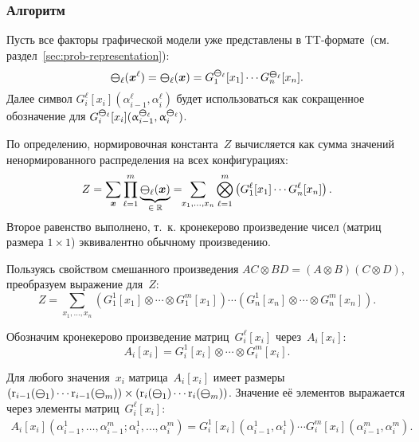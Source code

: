 \subsubsection{Алгоритм}
Пусть все факторы графической модели уже представлены в TT\hyp{}формате~(см. раздел~\ref{sec:prob-representation}):
\begin{equation}
\boldsymbol{\mathcal{\Psi}}_{\ell}(\boldsymbol{x}^{\ell}) = \boldsymbol{\mathcal{\Psi}}_{\ell}(\boldsymbol{x}) = G^{\boldsymbol{\mathcal{\Psi}}_{\ell}}_1[x_1] \dotsm G^{\boldsymbol{\mathcal{\Psi}}_{\ell}}_n[x_n].
\end{equation}
Далее символ $G^{\ell}_i[x_i](\alpha^{\ell}_{i - 1}, \alpha^{\ell}_i)$ будет использоваться как сокращенное обозначение для $G^{\boldsymbol{\mathcal{\Psi}}_{\ell}}_i[x_i](\upalpha^{\boldsymbol{\mathcal{\Psi}}_{\ell}}_{i - 1}, \upalpha^{\boldsymbol{\mathcal{\Psi}}_{\ell}}_i)$.

По определению, нормировочная константа~$Z$ вычисляется как сумма значений ненормированного распределения на всех конфигурациях:
\begin{equation*}
Z = \sum_{\boldsymbol{x}} \prod_{\ell = 1}^{m} \underbrace{\boldsymbol{\mathcal{\Psi}}_{\ell}(\boldsymbol{x})}_{\text{$\in \mathbb{R}$}}
= \!\!\sum_{x_1, \dots, x_n} \bigotimes_{\ell = 1}^{m} \left (G^{\ell}_1[x_1] \dotsm G^{\ell}_n[x_n]  \right).
\end{equation*}
Второе равенство выполнено, т.~к. кронекерово произведение чисел (матриц размера $1 \times 1$) эквивалентно обычному произведению.


Пользуясь свойством смешанного произведения $AC \otimes BD = (A\otimes B)(C \otimes D)$, преобразуем выражение для~$Z$:
\begin{equation*}
Z =
\sum_{x_1, \dots, x_n} \left ( G^1_1[x_1] \otimes \dotsb \otimes G^m_1[x_1] \right ) \dotsm
\left ( G^1_n[x_n] \otimes \dotsb \otimes G^m_n[x_n] \right ).
\end{equation*}

Обозначим кронекерово произведение матриц~$G^\ell_i[x_i]$ через~$A_i[x_i]$:
\begin{equation*}
A_i[x_i] = G^1_i[x_i] \otimes \dotsb \otimes G^m_i[x_i].
\end{equation*}

Для любого значения~$x_i$ матрица~$A_i[x_i]$ имеет размеры $(\operatorname{r}_{i - 1}(\boldsymbol{\mathcal{\Psi}}_1)  \dotsm  \operatorname{r}_{i - 1}(\boldsymbol{\mathcal{\Psi}}_m)) \times (\operatorname{r}_{i}(\boldsymbol{\mathcal{\Psi}}_1)  \dotsm  \operatorname{r}_{i}(\boldsymbol{\mathcal{\Psi}}_m))$. Значение её элементов выражается через элементы матриц~$G_i^{\ell}[x_i]$:
\begin{multline*}
A_i[x_i](\alpha^1_{i - 1}, \dots, \alpha^m_{i - 1}; \alpha^1_i, \dots, \alpha^m_i) = G^1_i[x_i](\alpha^1_{i - 1}, \alpha^1_i)  \dotsm  G^m_i[x_i](\alpha^m_{i - 1}, \alpha^m_i).
\end{multline*}

